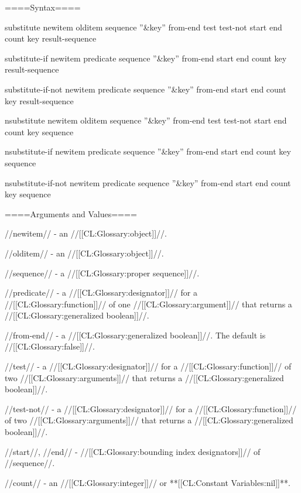
====Syntax====

\DefunWithValuesNewline substitute {newitem olditem sequence ''&key'' from-end test test-not start end count key} {result-sequence}

\DefunWithValuesNewline substitute-if {newitem predicate sequence ''&key'' from-end start end count key} {result-sequence}

\DefunWithValuesNewline substitute-if-not {newitem predicate sequence ''&key'' from-end start end count key} {result-sequence}

\DefunWithValuesNewline nsubstitute {newitem olditem sequence ''&key'' from-end test test-not start end count key} {sequence}

\DefunWithValuesNewline nsubstitute-if {newitem predicate sequence ''&key'' from-end start end count key} {sequence}

\DefunWithValuesNewline nsubstitute-if-not {newitem predicate sequence ''&key'' from-end start end count key} {sequence}

====Arguments and Values====

//newitem// - an //[[CL:Glossary:object]]//.

//olditem// - an //[[CL:Glossary:object]]//.

//sequence// - a //[[CL:Glossary:proper sequence]]//.

//predicate// - a //[[CL:Glossary:designator]]// for a //[[CL:Glossary:function]]// of one //[[CL:Glossary:argument]]// that returns a //[[CL:Glossary:generalized boolean]]//.

//from-end// - a //[[CL:Glossary:generalized boolean]]//. The default is //[[CL:Glossary:false]]//.

//test// - a //[[CL:Glossary:designator]]// for a //[[CL:Glossary:function]]// of two //[[CL:Glossary:arguments]]// that returns a //[[CL:Glossary:generalized boolean]]//.

//test-not// - a //[[CL:Glossary:designator]]// for a //[[CL:Glossary:function]]// of two //[[CL:Glossary:arguments]]// that returns a //[[CL:Glossary:generalized boolean]]//.

//start//, //end// - //[[CL:Glossary:bounding index designators]]// of //sequence//. 

//count// - an //[[CL:Glossary:integer]]// or **[[CL:Constant Variables:nil]]**.

